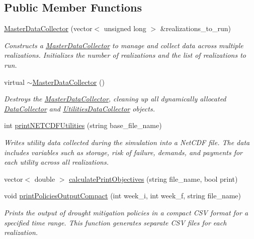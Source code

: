 \subsection*{Public Member Functions}
\begin{DoxyCompactItemize}
\item 
\mbox{\hyperlink{classMasterDataCollector_acb6f64c053bda26e5cf7e4ec8dacd0cd}{Master\+Data\+Collector}} (vector$<$ unsigned long $>$ \&realizations\+\_\+to\+\_\+run)
\begin{DoxyCompactList}\small\item\em Constructs a \mbox{\hyperlink{classMasterDataCollector}{Master\+Data\+Collector}} to manage and collect data across multiple realizations. Initializes the number of realizations and the list of realizations to run. \end{DoxyCompactList}\item 
virtual \mbox{\hyperlink{classMasterDataCollector_aedeef15ddcd660886261d8759db37029}{$\sim$\+Master\+Data\+Collector}} ()
\begin{DoxyCompactList}\small\item\em Destroys the \mbox{\hyperlink{classMasterDataCollector}{Master\+Data\+Collector}}, cleaning up all dynamically allocated \mbox{\hyperlink{classDataCollector}{Data\+Collector}} and \mbox{\hyperlink{classUtilitiesDataCollector}{Utilities\+Data\+Collector}} objects. \end{DoxyCompactList}\item 
int \mbox{\hyperlink{classMasterDataCollector_a87dd0c5e19af4baee55b3adfeabe1d01}{print\+N\+E\+T\+C\+D\+F\+Utilities}} (string base\+\_\+file\+\_\+name)
\begin{DoxyCompactList}\small\item\em Writes utility data collected during the simulation into a Net\+C\+DF file. The data includes variables such as storage, risk of failure, demands, and payments for each utility across all realizations. \end{DoxyCompactList}\item 
vector$<$ double $>$ \mbox{\hyperlink{classMasterDataCollector_a5cba2aca9ba3426293ca3b194a846c86}{calculate\+Print\+Objectives}} (string file\+\_\+name, bool print)
\item 
void \mbox{\hyperlink{classMasterDataCollector_aedd180f1f1648164506a0a59216c113f}{print\+Policies\+Output\+Compact}} (int week\+\_\+i, int week\+\_\+f, string file\+\_\+name)
\begin{DoxyCompactList}\small\item\em Prints the output of drought mitigation policies in a compact C\+SV format for a specified time range. This function generates separate C\+SV files for each realization. \end{DoxyCompactList}\item 

\end{DoxyCompactItemize}
